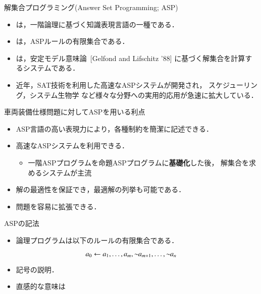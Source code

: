 \documentclass[dvipdfmx, 11pt]{beamer}
\begin{document}
\begin{frame}{解集合プログラミング(Answer Set Programming; ASP)}
 \begin{itemize}
 \item {}は，一階論理に基づく知識表現言語の一種である．
 \item {}は，ASPルールの有限集合である．
 \item {}は，安定モデル意味論~[Gelfond and Lifschitz '88]
   に基づく解集合を計算するシステムである．
 \item 近年，SAT技術を利用した高速なASPシステムが開発され，
   スケジューリング，システム生物学
   など様々な分野への実用的応用が急速に拡大している．
 \end{itemize}
\vfill
 \begin{alertblock}{車両装備仕様問題に対してASPを用いる利点}
   \begin{itemize} 
    \item ASP言語の高い表現力により，各種制約を簡潔に記述できる．
    \item 高速なASPシステムを利用できる．
	  \begin{itemize}
	   \item 一階ASPプログラムを命題ASPプログラムに\alert{\bf 基礎化}した後，
		 解集合を求めるシステムが主流
	  \end{itemize}
    \item 解の最適性を保証でき，最適解の列挙も可能である．
    \item 問題を容易に拡張できる．
   \end{itemize}
 \end{alertblock}
\end{frame}
\begin{frame}{ASPの記法}
 \begin{itemize}
  \item 論理プログラムは以下のルールの有限集合である．
 \end{itemize}
 \begin{equation}
  a_0\leftarrow a_1,\dots,a_m,{\sim\!\!{a_{m+1}}},\dots,{\sim\!\!{a_n}}
 \end{equation}
 \begin{itemize}
  \item 記号の説明．
  \item 直感的な意味は
 \end{itemize}
\end{frame}
\end{document}
